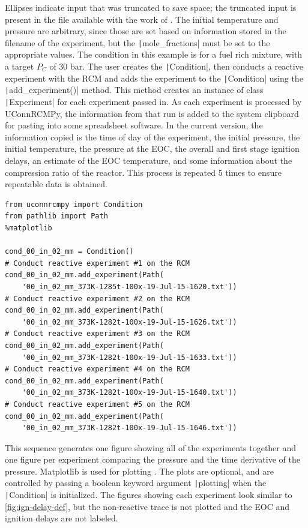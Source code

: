 \documentclass[12pt]{../ussci}
\begin{document}
Ellipses indicate input that was truncated to save space; the truncated
input is present in the file available with the work of \textcite{Dames2016}. The
initial temperature and pressure are arbitrary, since those are set
based on information stored in the filename of the experiment, but the
\texttt|mole_fractions| must be set to the appropriate values. The
condition in this example is for a fuel rich mixture, with a target
\(P_C\) of 30 bar. The user creates the \texttt|Condition|, then
conducts a reactive experiment with the RCM and adds the experiment to
the \texttt|Condition| using the \texttt|add_experiment()| method. This
method creates an instance of class \texttt|Experiment| for each
experiment passed in. As each experiment is processed by UConnRCMPy, the
information from that run is added to the system clipboard for pasting
into some spreadsheet software. In the current version, the information
copied is the time of day of the experiment, the initial pressure, the
initial temperature, the pressure at the EOC, the overall and first
stage ignition delays, an estimate of the EOC temperature, and some
information about the compression ratio of the reactor. This process is
repeated 5 times to ensure repeatable data is obtained.

\begin{verbatim}
from uconnrcmpy import Condition
from pathlib import Path
%matplotlib

cond_00_in_02_mm = Condition()
# Conduct reactive experiment #1 on the RCM
cond_00_in_02_mm.add_experiment(Path(
    '00_in_02_mm_373K-1285t-100x-19-Jul-15-1620.txt'))
# Conduct reactive experiment #2 on the RCM
cond_00_in_02_mm.add_experiment(Path(
    '00_in_02_mm_373K-1282t-100x-19-Jul-15-1626.txt'))
# Conduct reactive experiment #3 on the RCM
cond_00_in_02_mm.add_experiment(Path(
    '00_in_02_mm_373K-1282t-100x-19-Jul-15-1633.txt'))
# Conduct reactive experiment #4 on the RCM
cond_00_in_02_mm.add_experiment(Path(
    '00_in_02_mm_373K-1282t-100x-19-Jul-15-1640.txt'))
# Conduct reactive experiment #5 on the RCM
cond_00_in_02_mm.add_experiment(Path(
    '00_in_02_mm_373K-1282t-100x-19-Jul-15-1646.txt'))
\end{verbatim}

This sequence generates one figure showing all of the experiments
together and one figure per experiment comparing the pressure and the
time derivative of the pressure. Matplotlib is used for plotting
\autocite{Hunter2007}. The plots are optional, and are controlled by
passing a boolean keyword argument \texttt|plotting| when the
\texttt|Condition| is initialized. The figures showing each experiment
look similar to \cref{fig:ign-delay-def}, but the non-reactive
trace is not plotted and the EOC and ignition delays are not labeled.
\end{document}
